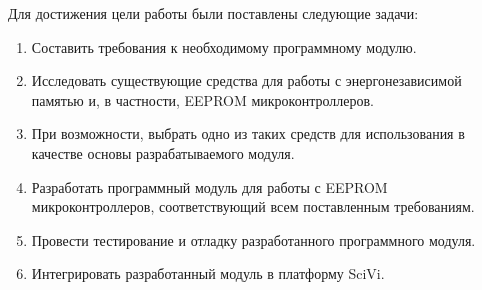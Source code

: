 Для достижения цели работы были поставлены следующие задачи:
\begin{enumerate}
	\item Составить требования к необходимому программному модулю.
	\item Исследовать существующие средства для работы с энергонезависимой памятью и, в частности, EEPROM микроконтроллеров.
	\item При возможности, выбрать одно из таких средств для использования в качестве основы разрабатываемого модуля.
	\item Разработать программный модуль для работы с EEPROM микроконтроллеров, соответствующий всем поставленным требованиям.
	\item Провести тестирование и отладку разработанного программного модуля.
	\item Интегрировать разработанный модуль в платформу SciVi.
\end{enumerate}
